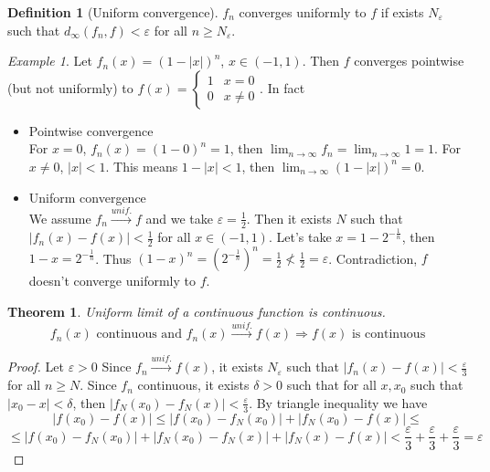 \documentclass{article}
\newcommand{\DS}{\displaystyle}
\newcommand{\abs}[1]{\left|#1\right|}
\newcommand{\Ar}{\Rightarrow}
\newcommand{\intoo}[1]{\left(#1\right)}
\newcommand{\limn}{\lim_{n \to \infty}}
\newcommand{\tounif}{\xrightarrow{unif.}}
\theoremstyle{definition}
\newtheorem{definition}{Definition}[section]
\theoremstyle{definition}
\theoremstyle{plain}
\newtheorem{theorem}{Theorem}[section]
\theoremstyle{plain}
\theoremstyle{plain}
\theoremstyle{plain}
\theoremstyle{definition}
\theoremstyle{remark}
\newtheorem{exampled}{Example}[definition]
\theoremstyle{remark}
\theoremstyle{remark}
\theoremstyle{remark}
\newcommand{\E}{\varepsilon}
\begin{document}
\begin{definition}[Uniform convergence]
  $f_n$ converges uniformly to $f$ if exists $N_\E$ such that $d_\infty(f_n,f) < \E$ for all $n \geq N_\E$.
\end{definition}

\begin{exampled}
  Let $f_n(x) = (1 - \abs{x})^n$, $x \in \intoo{-1,1}$. Then $f$ converges pointwise (but not uniformly) to $f(x) = \begin{cases}1 & x = 0 \\ 0 & x \neq 0\end{cases}$. In fact
    \begin{itemize}
    \item Pointwise convergence\\
      For $x = 0$, $f_n(x) = (1 - 0)^n = 1$, then $\DS \limn{f_n} = \limn{1} = 1$. For $x \neq 0$, $\abs{x} < 1$. This means $1 - |x| < 1$, then $\DS \limn{(1-|x|)^n} = 0$.
    \item Uniform convergence\\
      We assume $f_n \tounif f$ and we take $\E = \frac{1}{2}$. Then it exists $N$ such that $\abs{f_n(x) - f(x)} < \frac{1}{2}$ for all $x \in \intoo{-1,1}$. Let's take $x = 1 - 2^{-\frac{1}{n}}$, then $1 - x = 2^{-\frac{1}{n}}$. Thus $(1 - x)^n = (2^{-\frac{1}{n}})^n = \frac{1}{2} \nless \frac{1}{2} = \E$. Contradiction, $f$ doesn't converge uniformly to $f$.
    \end{itemize}
\end{exampled}


\begin{theorem}
  Uniform limit of a continuous function is continuous.
  \[
  f_n(x) \text{ continuous and } f_n(x) \tounif f(x) \Ar f(x) \text{ is continuous}
  \]
\end{theorem}

\begin{proof}
  Let $\E > 0$ Since $f_n \tounif f(x)$, it exists $N_\E$ such that $\abs{f_n(x)-f(x)} <
  \frac{\E}{3}$ for all $n \geq N$. Since $f_n$ continuous, it exists $\delta > 0$ such that for all $x,x_0$ such that $\abs{x_0 - x} < \delta$, then $\abs{f_N(x_0) - f_N(x)} < \frac{\E}{3}$. By triangle inequality we have
  \[
  \abs{f(x_0) - f(x)} \leq
  \abs{f(x_0) - f_N(x_0)} + \abs{f_N(x_0) - f(x)} \leq
  \]
  \[ \leq
  \abs{f(x_0) - f_N(x_0)} + \abs{f_N(x_0) - f_N(x)} + \abs{f_N(x) - f(x)} <
  \frac{\E}{3} + \frac{\E}{3} + \frac{\E}{3} =
  \E
  \]
\end{proof}
\end{document}
